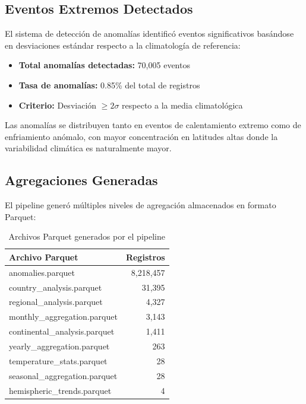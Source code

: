 \documentclass[12pt,a4paper]{scrartcl}
\begin{document}
\subsection{Eventos Extremos Detectados}

El sistema de detección de anomalías identificó eventos significativos basándose en desviaciones estándar respecto a la climatología de referencia:

\begin{itemize}
    \item \textbf{Total anomalías detectadas:} 70,005 eventos
    \item \textbf{Tasa de anomalías:} 0.85\% del total de registros
    \item \textbf{Criterio:} Desviación $\geq 2\sigma$ respecto a la media climatológica
\end{itemize}

Las anomalías se distribuyen tanto en eventos de calentamiento extremo como de enfriamiento anómalo, con mayor concentración en latitudes altas donde la variabilidad climática es naturalmente mayor.

\subsection{Agregaciones Generadas}

El pipeline generó múltiples niveles de agregación almacenados en formato Parquet:

\begin{table}[h]
\centering
\begin{tabular}{@{}lr@{}}
\toprule
\textbf{Archivo Parquet} & \textbf{Registros} \\
\midrule
anomalies.parquet & 8,218,457 \\
country\_analysis.parquet & 31,395 \\
regional\_analysis.parquet & 4,327 \\
monthly\_aggregation.parquet & 3,143 \\
continental\_analysis.parquet & 1,411 \\
yearly\_aggregation.parquet & 263 \\
temperature\_stats.parquet & 28 \\
seasonal\_aggregation.parquet & 28 \\
hemispheric\_trends.parquet & 4 \\
\bottomrule
\end{tabular}
\caption{Archivos Parquet generados por el pipeline}
\end{table}
\end{document}
